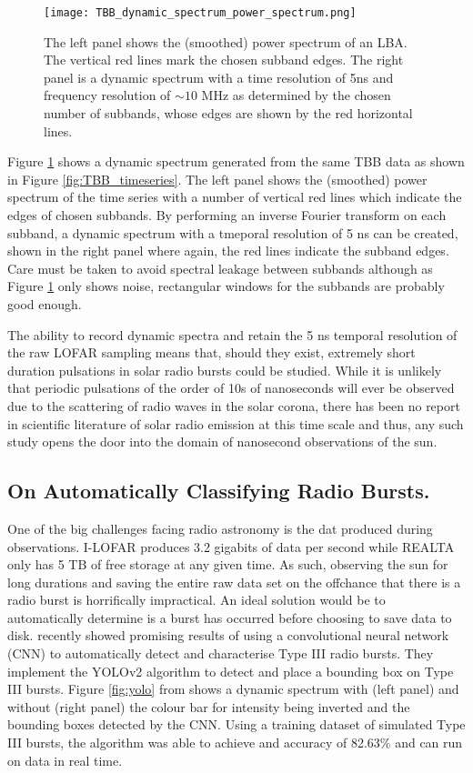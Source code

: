 \begin{figure}[ht]
\centering
\texttt{[image: TBB\_dynamic\_spectrum\_power\_spectrum.png]}
\caption[A dynamic spectrum generated with TBB data from I-LOFAR.]{The left panel shows the (smoothed) power spectrum of an LBA. The vertical red lines mark the chosen subband edges. The right panel is a dynamic spectrum with a time resolution of 5ns and frequency resolution of $\sim 10$ MHz as determined by the chosen number of subbands, whose edges are shown by the red horizontal lines.}
\label{fig:TBB_dynamicspectrum}
\end{figure}

Figure \ref{fig:TBB_dynamicspectrum} shows a dynamic spectrum generated from the same TBB data as shown in Figure \ref{fig:TBB_timeseries}. The left panel shows the (smoothed) power spectrum of the time series with a number of vertical red lines which indicate the edges of chosen subbands. By performing an inverse Fourier transform on each subband, a dynamic spectrum with a tmeporal resolution of 5 ns can be created, shown in the right panel where again, the red lines indicate the subband edges. Care must be taken to avoid spectral leakage between subbands although as Figure \ref{fig:TBB_dynamicspectrum} only shows noise, rectangular windows for the subbands are probably good enough.
 
The ability to record dynamic spectra and retain the 5 ns temporal resolution of the raw LOFAR sampling means that, should they exist, extremely short duration pulsations in solar radio bursts could be studied. While it is unlikely that periodic pulsations of the order of 10s of nanoseconds will ever be observed due to the scattering of radio waves in the solar corona, there has been no report in scientific literature of solar radio emission at this time scale and thus, any such study opens the door into the domain of nanosecond observations of the sun.

\subsection{On Automatically Classifying Radio Bursts.}
One of the big challenges facing radio astronomy is the dat produced during observations. I-LOFAR produces 3.2 gigabits of data per second while REALTA only has 5 TB of free storage at any given time. As such, observing the sun for long durations and saving the entire raw data set on the offchance that there is a radio burst is horrifically impractical. An ideal solution would be to automatically determine is a burst has occurred before choosing to save data to disk. \cite{Scully2021} recently showed promising results of using a convolutional neural network (CNN) to automatically detect and characterise Type III radio bursts. They implement the YOLOv2 \citep[You Only Look Once;][]{Yolo9000} algorithm to detect and place a bounding box on Type III bursts. Figure \ref{fig:yolo} from \cite{Scully2021} shows a dynamic spectrum with (left panel) and without (right panel) the colour bar for intensity being inverted and the bounding boxes detected by the CNN. Using a training dataset of simulated Type III bursts, the algorithm was able to achieve and accuracy of 82.63$\%$ and can run on data in real time.  

